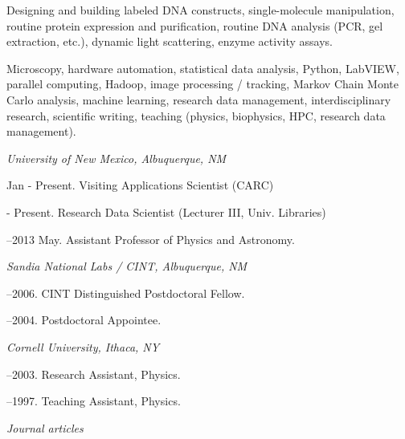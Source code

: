 \documentclass[11pt]{article}
\begin{document}
\noindent Designing and building labeled DNA constructs, single-molecule manipulation, routine protein expression and purification, routine DNA analysis (PCR, gel extraction, etc.), dynamic light scattering, enzyme activity assays. %

\bigskip



\noindent Microscopy, hardware automation, statistical data analysis, Python, LabVIEW, parallel computing, Hadoop, image processing / tracking, Markov Chain Monte Carlo analysis, machine learning, research data management, interdisciplinary research, scientific writing, teaching (physics, biophysics, HPC, research data management). %

\bigskip

\medskip
{}

\noindent\emph{University of New Mexico, Albuquerque, NM \vspace{0.01in}}

 Jan - Present. Visiting Applications Scientist (CARC)

 - Present. Research Data Scientist (Lecturer III, Univ. Libraries)

–2013 May. Assistant Professor of Physics and Astronomy.      

\medskip
\noindent\emph{Sandia National Labs / CINT, Albuquerque, NM \vspace{0.01in}}

–2006. CINT Distinguished Postdoctoral Fellow.

–2004. Postdoctoral Appointee.

\medskip

\noindent\emph{Cornell University, Ithaca, NY \vspace{0.01in}}

–2003. Research Assistant, Physics.

–1997. Teaching Assistant, Physics.

\bigskip

 
\medskip
\noindent\emph{Journal articles \vspace{0.05in}}
 
\end{document}
